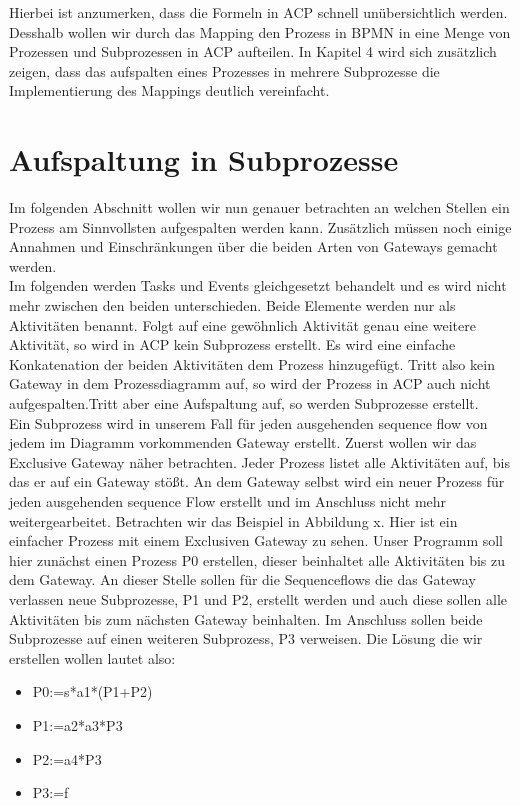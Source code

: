 Hierbei ist anzumerken, dass die Formeln in ACP schnell unübersichtlich werden. Desshalb wollen wir durch das Mapping den Prozess in BPMN in eine Menge von Prozessen und Subprozessen in ACP aufteilen. In Kapitel 4 wird sich zusätzlich zeigen, dass das aufspalten eines Prozesses in mehrere Subprozesse die Implementierung des Mappings deutlich vereinfacht.\\
\section {Aufspaltung in Subprozesse}\label{Aufspaltung in Subprozesse}
Im folgenden Abschnitt wollen wir nun genauer betrachten an welchen Stellen ein Prozess am Sinnvollsten aufgespalten werden kann. Zusätzlich müssen noch einige Annahmen und Einschränkungen über die beiden Arten von Gateways gemacht werden.\\
Im folgenden werden Tasks und Events gleichgesetzt behandelt und es wird nicht mehr zwischen den beiden unterschieden. Beide Elemente werden nur als Aktivitäten benannt. Folgt auf eine gewöhnlich Aktivität genau eine weitere Aktivität, so wird in ACP kein Subprozess erstellt. Es wird eine einfache Konkatenation der beiden Aktivitäten dem Prozess hinzugefügt. Tritt also kein Gateway in dem Prozessdiagramm auf, so wird der Prozess in ACP auch nicht aufgespalten.Tritt aber eine Aufspaltung auf, so werden Subprozesse erstellt.\\
Ein Subprozess wird in unserem Fall für jeden ausgehenden sequence flow von jedem im Diagramm vorkommenden Gateway erstellt. Zuerst wollen wir das Exclusive Gateway näher betrachten. Jeder Prozess listet alle Aktivitäten auf, bis das er auf ein Gateway stößt. An dem Gateway selbst wird ein neuer Prozess für jeden ausgehenden sequence Flow erstellt und im Anschluss nicht mehr weitergearbeitet. Betrachten wir das Beispiel in Abbildung x. Hier ist ein einfacher Prozess mit einem Exclusiven Gateway zu sehen. Unser Programm soll hier zunächst einen Prozess P0 erstellen, dieser beinhaltet alle Aktivitäten bis zu dem Gateway. An dieser Stelle sollen für die Sequenceflows die das Gateway verlassen neue Subprozesse, P1 und P2, erstellt werden und auch diese sollen alle Aktivitäten bis zum nächsten Gateway beinhalten. Im Anschluss sollen beide Subprozesse auf einen weiteren Subprozess, P3 verweisen. Die Lösung die wir erstellen wollen lautet also:\\
\begin{itemize}
\item P0:=s*a1*(P1+P2)
\item P1:=a2*a3*P3
\item P2:=a4*P3
\item P3:=f
\end{itemize}
